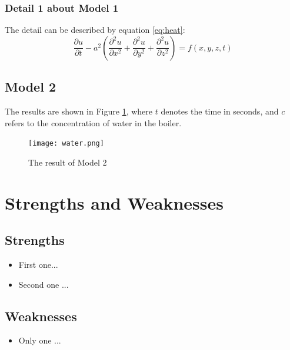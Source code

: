 \documentclass[12pt]{article}  %
\begin{document}
\subsubsection{Detail 1 about Model 1}
The detail can be described by equation \eqref{eq:heat}:
\begin{equation}\label{eq:heat}
\frac{\partial u}{\partial t} - a^2 \left( \frac{\partial^2 u}{\partial x^2} + \frac{\partial^2 u}{\partial y^2} + \frac{\partial^2 u}{\partial z^2} \right) = f(x, y, z, t)
\end{equation}

\subsection{Model 2}
The results are shown in Figure \ref{fig:result}, where $t$ denotes the time in seconds, and $c$ refers to the concentration of water in the boiler.

\begin{figure}[htbp]
\centering
\texttt{[image: water.png]}
\caption{The result of Model 2}\label{fig:result}
\end{figure}

\section{Strengths and Weaknesses}
\subsection{Strengths}
\begin{itemize}
    \item First one...
    \item Second one ...
\end{itemize}

\subsection{Weaknesses}
\begin{itemize}
    \item Only one ...
 \end{itemize}
\end{document}
